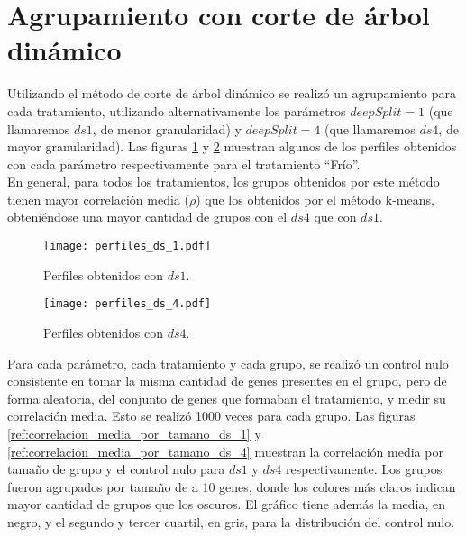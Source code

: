 \section{Agrupamiento con corte de árbol dinámico}
Utilizando el método de corte de árbol dinámico se realizó un agrupamiento para cada tratamiento, utilizando alternativamente los parámetros $deepSplit=1$ (que llamaremos $ds1$, de menor granularidad) y $deepSplit=4$ (que llamaremos $ds4$, de mayor granularidad). Las figuras \ref{fig:perfiles_ds_1} y \ref{fig:perfiles_ds_4} muestran algunos de los perfiles obtenidos con cada parámetro respectivamente para el tratamiento ``Frío''.\\ 
En general, para todos los tratamientos, los grupos obtenidos por este método tienen mayor correlación media ($\rho$) que los obtenidos por el método k-means, obteniéndose una mayor cantidad de grupos con el $ds4$ que con $ds1$.\\
\begin{figure*}[t!]
    \centering
    \begin{subfigure}[t]{0.45\textwidth}
    \centering
    \texttt{[image: perfiles\_ds\_1.pdf]}
    \caption{Perfiles obtenidos con $ds1$.}
    \label{fig:perfiles_ds_1}
    \end{subfigure}
    \begin{subfigure}[t]{0.45\textwidth}
    \centering
    \texttt{[image: perfiles\_ds\_4.pdf]}
    \caption{Perfiles obtenidos con $ds4$.}
    \label{fig:perfiles_ds_4}
    \end{subfigure}
    \caption{Perfiles de expresión génica obtenidos con el método corte de árbol dinámico para $ds1$ y $ds4$ para el tratamiento 'Frío'. En negro, el valor medio de cada grupo.}
\end{figure*}

Para cada parámetro, cada tratamiento y cada grupo, se realizó un control nulo consistente en tomar la misma cantidad de genes presentes en el grupo, pero de forma aleatoria, del conjunto de genes que formaban el tratamiento, y medir su correlación media. Esto se realizó 1000 veces para cada grupo. Las figuras \ref{ref:correlacion_media_por_tamano_ds_1} y \ref{ref:correlacion_media_por_tamano_ds_4} muestran la correlación media por tamaño de grupo y el control nulo para $ds1$ y $ds4$ respectivamente. Los grupos fueron agrupados por tamaño de a 10 genes, donde los colores más claros indican mayor cantidad de grupos que los oscuros. El gráfico tiene además la media, en negro, y el segundo y tercer cuartil, en gris, para la distribución del control nulo.

